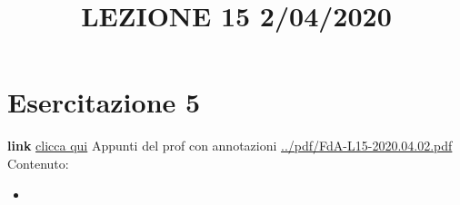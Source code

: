 \section{Esercitazione 5}
\title{LEZIONE 15 2/04/2020}\newline
\textbf{link} \href{https://web.microsoftstream.com/video/208fe47d-34d0-49da-8f31-916e1297a91b?list=user&userId=faa91214-a6f5-40d7-8875-253fd49b8ce1}{clicca qui}\newline
\newline
Appunti del prof con annotazioni \url{../pdf/FdA-L15-2020.04.02.pdf}
Contenuto:
\begin{itemize}
    \item 
\end{itemize}